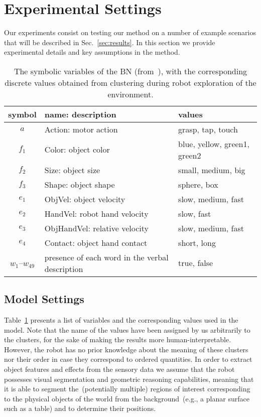 \section{Experimental Settings}
\label{sec:experimental_settings}
Our experiments consist on testing our method on a number of example scenarios that will be described in Sec.~\ref{sec:results}.
In this section we provide experimental details and key assumptions in the method.

\begin{table}
    \centering
    \caption{The symbolic variables of the \acl{BN} (from~\cite{salvi:2012:smcb}), with the corresponding discrete values obtained from clustering during robot exploration of the environment.}
    \label{tab:bnsymb}
    \begin{tabular}{cp{3.3cm}l}
    \toprule
    symbol & name: description     & values \\
    \midrule
    $a$ & Action: motor action          & grasp, tap, touch \\
    \midrule
    $f_1$ & Color: object color   & blue, yellow, green1, green2 \\
    $f_2$ & Size: object size     & small, medium, big \\
    $f_3$ & Shape: object shape    & sphere, box \\ %
    \midrule
    $e_1$ & ObjVel: object velocity & slow, medium, fast \\
    $e_2$ & HandVel: robot hand velocity & slow, fast \\
    $e_3$ & ObjHandVel: relative \objecthand{} velocity & slow, medium, fast \\
    $e_4$ & Contact: object hand contact & short, long \\
    \midrule
    $w_1$--$w_{49}$ & presence of each word in the verbal description & true, false \\
    \bottomrule
    \end{tabular}
\end{table}

\subsection{\AffWords{} Model Settings}
\label{sec:notation}
Table~\ref{tab:bnsymb} presents a list of variables and the corresponding values used in the \AffWords{} model.
Note that the name of the values have been assigned by us arbitrarily to the clusters, for the sake of making the results more human-interpretable.
However, the robot has no prior knowledge about the meaning of these clusters nor their order in case they correspond to ordered quantities.
In order to extract object features and effects from the sensory data we assume that the robot possesses visual segmentation and geometric reasoning capabilities, meaning that it is able to segment the~(potentially multiple) regions of interest corresponding to the physical objects of the world from the background~(e.g., a planar surface such as a table) and to determine their positions.

